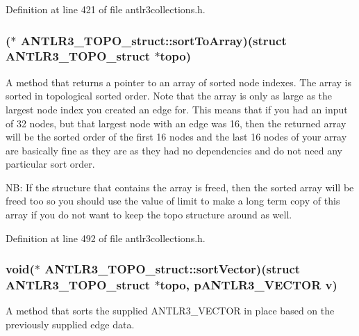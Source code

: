 Definition at line 421 of file antlr3collections.\-h.

\hypertarget{struct_a_n_t_l_r3___t_o_p_o__struct_a5778c7c2e8db3291ca33797ec9278507}{
\subsubsection[{sort\-To\-Array}]{($\ast$ A\-N\-T\-L\-R3\-\_\-\-T\-O\-P\-O\-\_\-struct\-::sort\-To\-Array)(struct {\bf A\-N\-T\-L\-R3\-\_\-\-T\-O\-P\-O\-\_\-struct} $\ast$topo)}}\label{struct_a_n_t_l_r3___t_o_p_o__struct_a5778c7c2e8db3291ca33797ec9278507}
A method that returns a pointer to an array of sorted node indexes. The array is sorted in topological sorted order. Note that the array is only as large as the largest node index you created an edge for. This means that if you had an input of 32 nodes, but that largest node with an edge was 16, then the returned array will be the sorted order of the first 16 nodes and the last 16 nodes of your array are basically fine as they are as they had no dependencies and do not need any particular sort order.

N\-B\-: If the structure that contains the array is freed, then the sorted array will be freed too so you should use the value of limit to make a long term copy of this array if you do not want to keep the topo structure around as well. 

Definition at line 492 of file antlr3collections.\-h.

\hypertarget{struct_a_n_t_l_r3___t_o_p_o__struct_a2a4e96e0e13c17271e067977ea2b92f3}{
\subsubsection[{sort\-Vector}]{\setlength{\rightskip}{0pt plus 5cm}void($\ast$ A\-N\-T\-L\-R3\-\_\-\-T\-O\-P\-O\-\_\-struct\-::sort\-Vector)(struct {\bf A\-N\-T\-L\-R3\-\_\-\-T\-O\-P\-O\-\_\-struct} $\ast$topo, {\bf p\-A\-N\-T\-L\-R3\-\_\-\-V\-E\-C\-T\-O\-R} {\bf v})}}\label{struct_a_n_t_l_r3___t_o_p_o__struct_a2a4e96e0e13c17271e067977ea2b92f3}
A method that sorts the supplied A\-N\-T\-L\-R3\-\_\-\-V\-E\-C\-T\-O\-R in place based on the previously supplied edge data. 

